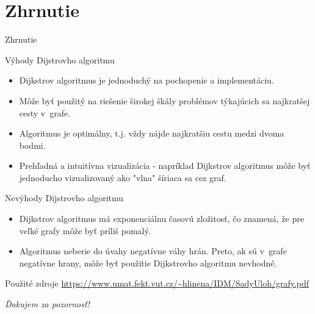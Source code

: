 \documentclass[15pt]{beamer}
\begin{document}
\section{Zhrnutie}
\begin{frame}{Zhrnutie}
			
	\begin{block}{Výhody Dijstrovho algoritmu}
		\begin{itemize}
			\item Dijkstrov algoritmus je jednoduchý na pochopenie a implementáciu.
			\item Môže byť použitý na riešenie širokej škály problémov týkajúcich sa najkratšej cesty v~grafe.
			\item Algoritmus je optimálny, t.j. vždy nájde najkratšiu cestu medzi dvoma bodmi.
			\item Prehľadná a intuitívna vizualizácia - napríklad Dijkstrov algoritmus môže byť jednoducho vizualizovaný ako "vlna" šíriaca sa cez graf.
		\end{itemize}
	\end{block}
			
	\begin{block}{Nevýhody Dijstrovho algoritmu}
		\begin{itemize}
			\item Dijkstrov algoritmus má exponenciálnu časovú zložitosť, čo znamená, že pre veľké grafy môže byť príliš pomalý.
			\item Algoritmus neberie do úvahy negatívne váhy hrán. Preto, ak sú v~grafe negatívne hrany, môže byť použitie Dijkstrovho algoritmu nevhodné.
		\end{itemize}
	\end{block}
\end{frame}

\begin{frame}{Použité zdroje}
	\url{https://www.umat.fekt.vut.cz/~hlinena/IDM/SadyUloh/grafy.pdf}
\end{frame}

\begin{frame}{}
	\centering \Huge \emph{Ďakujem za pozornosť!}
\end{frame}
\end{document}

